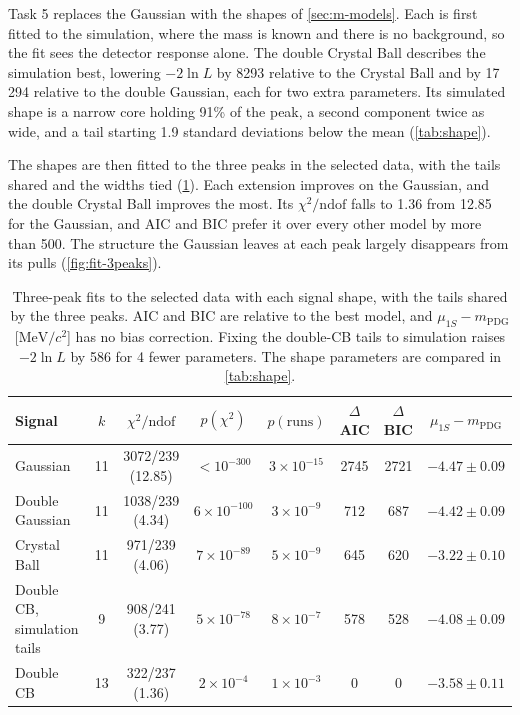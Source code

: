 \documentclass[a4paper,11pt]{article}
\newcommand{\MeVcc}{\ensuremath{\mathrm{MeV}/c^2}}
\begin{document}
Task 5 replaces the Gaussian with the shapes of \cref{sec:m-models}.
Each is first fitted to the simulation, where the mass is known and there is no background, so the fit sees the detector response alone.
The double Crystal Ball describes the simulation best, lowering $-2\ln L$ by 8293 relative to the Crystal Ball and by 17\,294 relative to the double Gaussian, each for two extra parameters.
Its simulated shape is a narrow core holding 91\% of the peak, a second component twice as wide, and a tail starting 1.9 standard deviations below the mean (\cref{tab:shape}).

The shapes are then fitted to the three peaks in the selected data, with the tails shared and the widths tied (\cref{tab:comparison}).
Each extension improves on the Gaussian, and the double Crystal Ball improves the most.
Its $\chi^2/\mathrm{ndof}$ falls to 1.36 from 12.85 for the Gaussian, and AIC and BIC prefer it over every other model by more than 500.
The structure the Gaussian leaves at each peak largely disappears from its pulls (\cref{fig:fit-3peaks}).

\begin{table}[H]
    \centering
    \caption{Three-peak fits to the selected data with each signal shape, with the tails shared by the three
    peaks. AIC and BIC are relative to the best model, and $\mu_{1S} - m_\mathrm{PDG}$ [\MeVcc] has no
    bias correction. Fixing the double-CB tails to simulation raises $-2\ln L$ by 586 for 4 fewer
    parameters. The shape parameters are compared in \cref{tab:shape}.}
    \label{tab:comparison}
    \small
    \setlength{\tabcolsep}{4pt}
    \begin{tabular}{lccccccc}
        \toprule
        Signal & $k$ & $\chi^2/\mathrm{ndof}$ & $p(\chi^2)$ & $p(\mathrm{runs})$ & $\Delta$AIC & $\Delta$BIC & $\mu_{1S} - m_\mathrm{PDG}$ \\
        \midrule
        Gaussian & 11 & 3072/239 (12.85) & $<10^{-300}$ & $3\times10^{-15}$ & 2745 & 2721 & $-4.47 \pm 0.09$ \\
        Double Gaussian & 11 & 1038/239 (4.34) & $6\times10^{-100}$ & $3\times10^{-9}$ & 712 & 687 & $-4.42 \pm 0.09$ \\
        Crystal Ball & 11 & 971/239 (4.06) & $7\times10^{-89}$ & $5\times10^{-9}$ & 645 & 620 & $-3.22 \pm 0.10$ \\
        Double CB, simulation tails & 9 & 908/241 (3.77) & $5\times10^{-78}$ & $8\times10^{-7}$ & 578 & 528 & $-4.08 \pm 0.09$ \\
        Double CB & 13 & 322/237 (1.36) & $2\times10^{-4}$ & $1\times10^{-3}$ & 0 & 0 & $-3.58 \pm 0.11$ \\
        \bottomrule
    \end{tabular}
\end{table}
\end{document}
